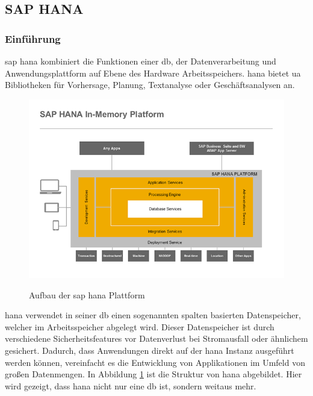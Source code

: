 \subsection{SAP HANA}
\label{sec:db-hana}

\subsubsection{Einführung}
\label{sec:db-hana-intro}
\gls{sap} \gls{hana} kombiniert die Funktionen einer \gls{db}, der Datenverarbeitung und Anwendungsplattform auf Ebene des Hardware Arbeitsspeichers. \gls{hana} bietet \gls{ua} Bibliotheken für Vorhersage, Planung, Textanalyse oder Geschäftsanalysen an.\\

\begin{figure}[H]
	\begin{center}
	\includegraphics[width=1\linewidth]{grafiken/hana-features-overview.png}
	\vspace{-20pt}
	\caption{Aufbau der \gls{sap} \gls{hana} Plattform \cite{SAPHanaAbout}}
	\vspace{-10pt}
	\label{abb:SAPHanaAbout}
	\end{center}
\end{figure}

\gls{hana} verwendet in seiner \gls{db} einen sogenannten spalten basierten Datenspeicher, welcher im Arbeitsspeicher abgelegt wird. Dieser Datenspeicher ist durch verschiedene Sicherheitsfeatures vor Datenverlust bei Stromausfall oder ähnlichem gesichert.
Dadurch, dass Anwendungen direkt auf der \gls{hana} Instanz ausgeführt werden können, vereinfacht es die Entwicklung von Applikationen im Umfeld von großen Datenmengen. In Abbildung \ref{abb:SAPHanaAbout} ist die Struktur von \gls{hana} abgebildet. Hier wird gezeigt, dass \gls{hana} nicht nur eine \gls{db} ist, sondern weitaus mehr.

